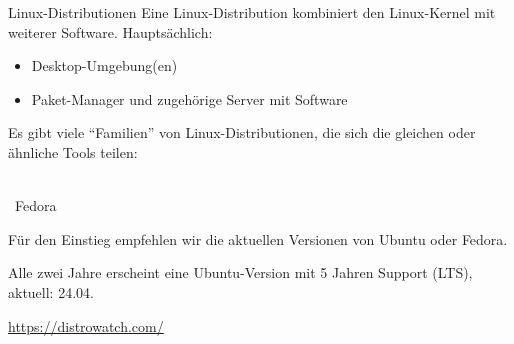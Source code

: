 \begin{frame}{Linux-Distributionen}
    Eine Linux-Distribution kombiniert den Linux-Kernel mit weiterer Software. Hauptsächlich:
    \begin{itemize}
        \item Desktop-Umgebung(en)
        \item Paket-Manager und zugehörige Server mit Software
    \end{itemize}

    Es gibt viele \enquote{Familien} von Linux-Distributionen, die sich die gleichen oder ähnliche Tools teilen:
    \begin{center}
        \hspace{0.5cm} \\[1\baselineskip]

        ~{\Huge Fedora}
        \hspace{0.5cm}
    \end{center}

    Für den Einstieg empfehlen wir die aktuellen Versionen von Ubuntu oder Fedora.

    Alle zwei Jahre erscheint eine Ubuntu-Version mit 5 Jahren Support (LTS), aktuell: 24.04.

    \url{https://distrowatch.com/}
\end{frame}

